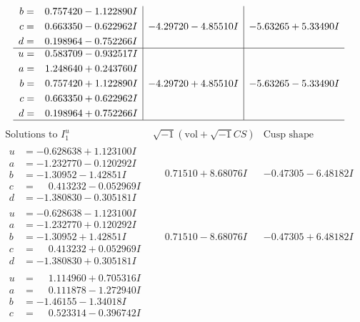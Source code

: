 \documentclass[1p]{elsarticle_modified}
\theoremstyle{definition}
\newcommand{\I}{\sqrt{-1}}
\begin{document}
$$\begin{array}{c|c|c}
\begin{aligned}
b &= \phantom{-}0.757420 - 1.122890 I \\
c &= \phantom{-}0.663350 - 0.622962 I \\
d &= \phantom{-}0.198964 - 0.752266 I\end{aligned}
 & -4.29720 - 4.85510 I & -5.63265 + 5.33490 I \\ \hline\begin{aligned}
u &= \phantom{-}0.583709 - 0.932517 I \\
a &= \phantom{-}1.248640 + 0.243760 I \\
b &= \phantom{-}0.757420 + 1.122890 I \\
c &= \phantom{-}0.663350 + 0.622962 I \\
d &= \phantom{-}0.198964 + 0.752266 I\end{aligned}
 & -4.29720 + 4.85510 I & -5.63265 - 5.33490 I\\
 \hline 
 \end{array}$$\newpage$$\begin{array}{c|c|c}  
\text{Solutions to }I^u_{1}& \I (\text{vol} + \sqrt{-1}CS) & \text{Cusp shape}\\
 \hline 
\begin{aligned}
u &= -0.628638 + 1.123100 I \\
a &= -1.232770 - 0.120292 I \\
b &= -1.30952 - 1.42851 I \\
c &= \phantom{-}0.413232 - 0.052969 I \\
d &= -1.380830 - 0.305181 I\end{aligned}
 & \phantom{-}0.71510 + 8.68076 I & -0.47305 - 6.48182 I \\ \hline\begin{aligned}
u &= -0.628638 - 1.123100 I \\
a &= -1.232770 + 0.120292 I \\
b &= -1.30952 + 1.42851 I \\
c &= \phantom{-}0.413232 + 0.052969 I \\
d &= -1.380830 + 0.305181 I\end{aligned}
 & \phantom{-}0.71510 - 8.68076 I & -0.47305 + 6.48182 I \\ \hline\begin{aligned}
u &= \phantom{-}1.114960 + 0.705316 I \\
a &= \phantom{-}0.111878 - 1.272940 I \\
b &= -1.46155 - 1.34018 I \\
c &= \phantom{-}0.523314 - 0.396742 I \\

\end{aligned}
\end{array}$$
\end{document}

